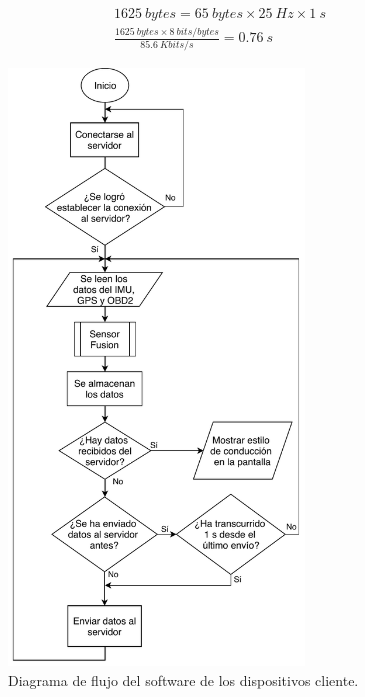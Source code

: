 \begin{align}
\SI{1625}{bytes}=\SI{65}{bytes}\times\SI{25}{Hz}\times\SI{1}{s} \label{eq:data_acum1} \\
\frac{\SI{1625}{bytes}\times\SI{8}{bits/bytes}}{\SI{85.6}{Kbits/s}}=\SI{0.76}{s}
\label{eq:data_acum2}
\end{align}

\begin{figure}[hbtp!]
\centering
\includegraphics[width=0.7\textwidth]{Flujo_cliente.pdf}
\caption{Diagrama de flujo del software de los dispositivos cliente.}
\label{fig:Flujo_cliente}
\end{figure}

